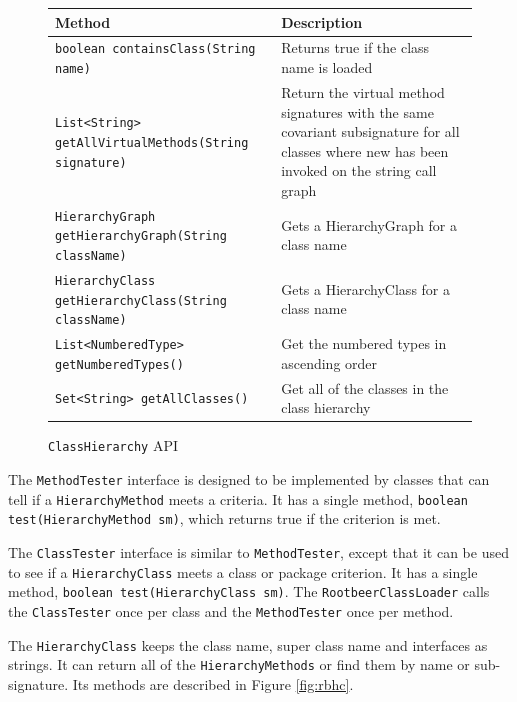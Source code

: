 \documentclass{sigplanconf}
\begin{document}
\begin{figure}[htbf]
\begin{tabularx}{\textwidth}{|XX|}
\hline
{\bf Method} & {\bf Description }\\\hline
{\tt boolean containsClass(String name)} & Returns true if the 
    class name is loaded \\\hline
{\tt List<String> getAllVirtualMethods(String signature)} & 
    Return the virtual method signatures with the same 
    covariant subsignature for all classes where new has been 
    invoked on the string call graph\\\hline
{\tt HierarchyGraph getHierarchyGraph(String className)} & 
    Gets a HierarchyGraph for a class name\\\hline
{\tt HierarchyClass getHierarchyClass(String className)} & 
    Gets a HierarchyClass for a class name\\\hline 
{\tt List<NumberedType> getNumberedTypes()} & Get the 
    numbered types in ascending order\\\hline
{\tt Set<String> getAllClasses()} & Get all of the classes in the
    class hierarchy\\\hline
\end{tabularx}
\caption{{\tt ClassHierarchy} API}
\label{fig:rbch}
\end{figure}


The {\tt MethodTester} interface is designed to be implemented by classes that can tell if a {\tt HierarchyMethod} meets a criteria. It has a single method, {\tt boolean test(HierarchyMethod sm)}, which returns true if the criterion is met.

The {\tt ClassTester} interface is similar to {\tt MethodTester}, except that it can be used to see if a {\tt HierarchyClass} meets a class or package criterion. It has a single method, {\tt boolean test(Hierarchy\-Class sm)}. The {\tt RootbeerClassLoader} calls the {\tt ClassTester} once per class and the {\tt MethodTester} once per method.

The {\tt HierarchyClass} keeps the class name, super class name and interfaces as strings. It can return all of the {\tt HierarchyMethods} or find them by name or sub-signature. Its methods are described in Figure \ref{fig:rbhc}.
\end{document}
